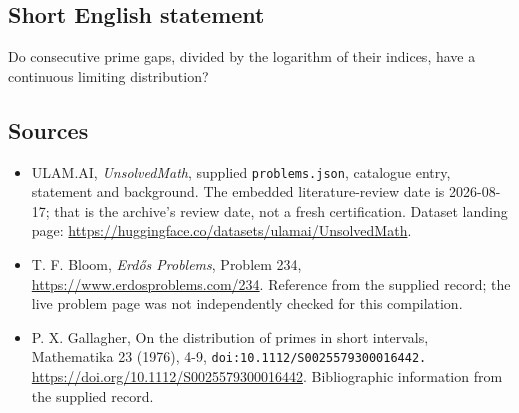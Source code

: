 \documentclass[11pt,a4paper]{article}
\begin{document}
\subsection{Short English statement}

Do consecutive prime gaps, divided by the logarithm of their indices, have a continuous limiting distribution?

\subsection{Sources}

{\small

\begin{itemize}

\item[\hypertarget{source:statement:1}{S1}] ULAM.AI, \emph{UnsolvedMath}, supplied \texttt{problems.json}, catalogue entry, statement and background. The embedded literature-review date is 2026-08-17; that is the archive’s review date, not a fresh certification. Dataset landing page: \url{https://huggingface.co/datasets/ulamai/UnsolvedMath}.

\item[\hypertarget{source:statement:2}{S2}] T. F. Bloom, \emph{Erdős Problems}, Problem 234, \url{https://www.erdosproblems.com/234}. Reference from the supplied record; the live problem page was not independently checked for this compilation.

\item[\hypertarget{source:statement:3}{S3}] P. X. Gallagher, On the distribution of primes in short intervals, Mathematika 23 (1976), 4-9, \nolinkurl{doi:10.1112/S0025579300016442.} \url{https://doi.org/10.1112/S0025579300016442}. Bibliographic information from the supplied record.

\end{itemize}

}

\label{end:statement}
\end{document}
